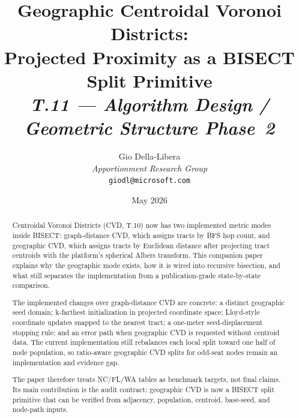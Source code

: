 \documentclass[12pt]{article}
\title{%
  \textbf{Geographic Centroidal Voronoi Districts:}\\
  \textbf{Projected Proximity as a BISECT Split Primitive}\\[0.8em]
  \normalsize\textit{T.11 --- Algorithm Design / Geometric Structure Phase~2}%
}
\author{%
  Gio Della-Libera\\
  \textit{Apportionment Research Group}\\
  \small\texttt{giodl@microsoft.com}
}
\date{May 2026}
\newcommand{\cvd}{\textsc{CVD}}
\begin{document}
\maketitle

\begin{abstract}
\noindent
Centroidal Voronoi Districts (\cvd{}, T.10) now has two implemented metric
modes inside BISECT: graph-distance CVD, which assigns tracts by BFS hop count,
and geographic CVD, which assigns tracts by Euclidean distance after projecting
tract centroids with the platform's spherical Albers transform. This companion
paper explains why the geographic mode exists, how it is wired into recursive
bisection, and what still separates the implementation from a publication-grade
state-by-state comparison.

The implemented changes over graph-distance CVD are concrete: a distinct
geographic seed domain; k-farthest initialization in projected coordinate
space; Lloyd-style coordinate updates snapped to the nearest tract; a
one-meter seed-displacement stopping rule; and an error path when geographic
CVD is requested without centroid data.
The current implementation still rebalances each local split toward one half
of node population, so ratio-aware geographic CVD splits for odd-seat nodes
remain an implementation and evidence gap.

The paper therefore treats NC/FL/WA tables as benchmark targets, not final
claims. Its main contribution is the audit contract: geographic CVD is now a
BISECT split primitive that can be verified from adjacency, population,
centroid, base-seed, and node-path inputs.
\end{abstract}

\tableofcontents
\newpage










\end{document}
